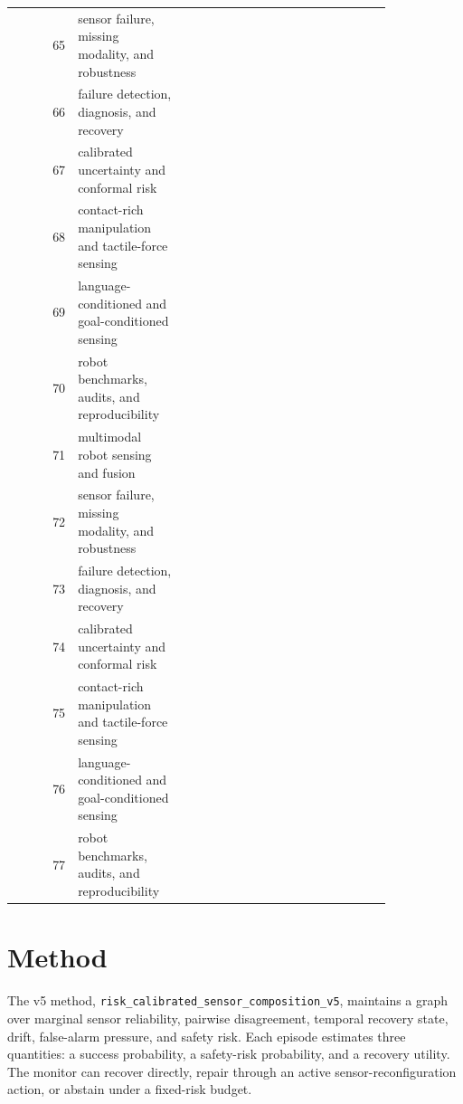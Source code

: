 \documentclass{article}
\begin{document}
\begin{longtable}{@{}r p{0.28\linewidth} p{0.55\linewidth}@{}}
65 & sensor failure, missing modality, and robustness & \citep{ablett2025multimodal193,sakib2025star194,chanda2022omission195} \\
66 & failure detection, diagnosis, and recovery & \citep{lunajimenez2021a196,wan2024progress197,cheng2021a198} \\
67 & calibrated uncertainty and conformal risk & \citep{agrawal2022a199,simonnajasek2023backside200,li2024m3tac201} \\
68 & contact-rich manipulation and tactile-force sensing & \citep{chen2025can202,gayathri2025metastackd203,alsharif2019energy204} \\
69 & language-conditioned and goal-conditioned sensing & \citep{aikins2024a205,zeng2019encoding206,baaij2022learning207} \\
70 & robot benchmarks, audits, and reproducibility & \citep{gorodeski2010application208,papatheodorou2025recent209,buchmann2025citation210} \\
71 & multimodal robot sensing and fusion & \citep{ganai2025realtime211,pacaud2025scaling212,sharma2022relec213} \\
72 & sensor failure, missing modality, and robustness & \citep{zhang2025a214,zhao2025polytouch215,zhou2024bioinspired216} \\
73 & failure detection, diagnosis, and recovery & \citep{subad2022soft217,fang2024force218,cholleti2021mechanical219} \\
74 & calibrated uncertainty and conformal risk & \citep{georgopoulou2020piezoresistive220,park2018multimodal221,das2021explainable222} \\
75 & contact-rich manipulation and tactile-force sensing & \citep{lu2025a223,gerboni2017feedback224,acar2003path225} \\
76 & language-conditioned and goal-conditioned sensing & \citep{sigcha2020deep226,ou2024autonomous227,inceoglu2024multimodal228} \\
77 & robot benchmarks, audits, and reproducibility & \citep{zhmud2018application229,alaba2022a230} \\
\bottomrule
\end{longtable}

\section{Method}
The v5 method, \texttt{risk\_calibrated\_sensor\_composition\_v5}, maintains a graph over marginal sensor reliability, pairwise disagreement, temporal recovery state, drift, false-alarm pressure, and safety risk. Each episode estimates three quantities: a success probability, a safety-risk probability, and a recovery utility. The monitor can recover directly, repair through an active sensor-reconfiguration action, or abstain under a fixed-risk budget.
\end{document}
